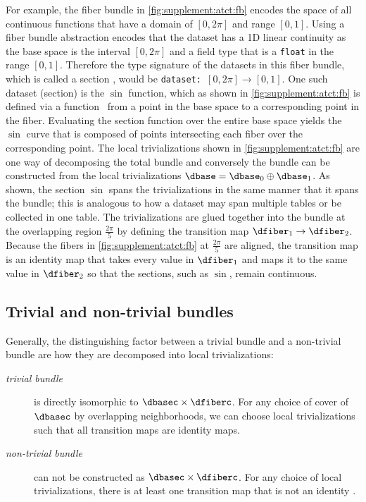 \documentclass{vgtc}
\theoremstyle{definition}
\theoremstyle{remark}
\begin{document}
For example, the fiber bundle in \autoref{fig:supplement:atct:fb} encodes the space of all continuous functions that have a domain of $[0, 2\pi]$ and range $[0,1]$. Using a fiber bundle abstraction encodes that the dataset has a 1D linear continuity as the base space \dbase is the interval $[0,2\pi]$ and a field type that is a \texttt{float} in the range $[0,1]$. Therefore the type signature of the datasets in this fiber bundle, which is called a section \dsection, would be \texttt{dataset: $[0, 2\pi] \rightarrow [0,1]$}. One such dataset (section) is the $\sin$ function, which as shown in \autoref{fig:supplement:atct:fb} is defined via a function \dsection\ from a point in the base space to a corresponding point in the fiber. Evaluating the section function over the entire base space yields the $\sin$ curve that is composed of points intersecting each fiber over the corresponding point. The local trivializations shown in \autoref{fig:supplement:atct:fb} are one way of decomposing the total bundle and conversely the bundle can be constructed from the local trivializations $\dbase = \dbase_{0} \oplus \dbase_{1}$. As shown, the section $\sin$ spans the trivializations in the same manner that it spans the bundle; this is analogous to how a dataset may span multiple tables or be collected in one table. The trivializations are glued together into the bundle at the overlapping region $\frac{2\pi}{5}$ by defining the transition map $\dfiber_{1} \rightarrow \dfiber_{2}$. Because the fibers in \autoref{fig:supplement:atct:fb} at $\frac{2\pi}{5}$ are aligned, the transition map is an identity map that takes every value in $\dfiber_1$ and maps it to the same value in $\dfiber_2$ so that the sections, such as $\sin$, remain continuous.


\subsection{Trivial and non-trivial bundles}
\label{sec:appendix:bundle_triviality}

Generally, the distinguishing factor between a trivial bundle and a non-trivial bundle are how they are decomposed into local trivializations:
\begin{description}
  \item[\textit{trivial bundle}] is directly isomorphic to $\dbasec\times\dfiberc$. For any choice of cover of $\dbasec$ by overlapping neighborhoods, we can choose local trivializations such that all transition maps are identity maps.
  \item[\textit{non-trivial bundle}] can not be constructed as $\dbasec\times\dfiberc$. For any choice of local trivializations, there is at least one transition map that is not an identity \cite{hatcherAlgebraicTopology2002}.
\end{description}
\end{document}
